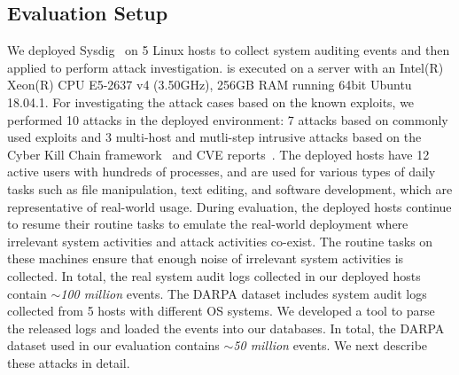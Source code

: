 \subsection{Evaluation Setup}
\label{subsec:evalsetup}
We deployed Sysdig~\cite{sysdig} on 5 Linux hosts to collect system auditing events and then applied \tool to perform attack investigation. 
\tool is executed on a server with an Intel(R) Xeon(R) CPU E5-2637 v4 (3.50GHz), 256GB RAM running 64bit Ubuntu 18.04.1.
For investigating the attack cases based on the known exploits, we performed 10 attacks in the deployed environment: 7 attacks based on commonly used exploits and 3 multi-host and mutli-step intrusive attacks based on the Cyber Kill Chain framework~\cite{cyberkillchain} and CVE reports~\cite{cve}.
The deployed hosts have 12 active users with hundreds of processes, and are used for various types of daily tasks such as file manipulation, text editing, and software development, which are representative of real-world usage.
During evaluation, the deployed hosts continue to resume their routine tasks to emulate the real-world deployment where irrelevant system activities and attack activities co-exist.
The routine tasks on these machines ensure that enough noise of irrelevant system activities is collected.
In total, the real system audit logs collected in our deployed hosts contain \emph{$\sim$100 million} events. 
The DARPA dataset includes system audit logs collected from 5 hosts with different OS systems.
We developed a tool to parse the released logs and loaded the events into our databases.
In total, the DARPA dataset used in our evaluation contains \emph{$\sim$50 million} events.
We next describe these attacks in detail. 










